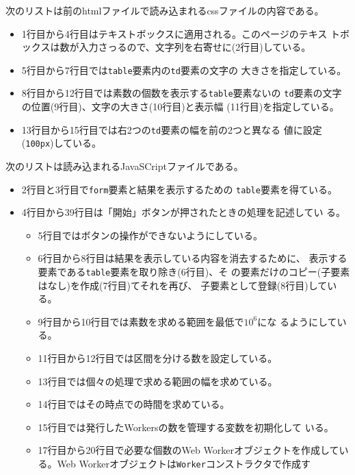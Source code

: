 \begin{Exec}
  次のリストは前のhtmlファイルで読み込まれるcssファイルの内容である。
 \begin{itemize}
  \item 1行目から4行目はテキストボックスに適用される。このページのテキス
        トボックスは数が入力さっるので、文字列を右寄せに(2行目)している。
  \item 5行目から7行目では\texttt{table}要素内の\texttt{td}要素の文字の
        大きさを指定している。 
  \item 8行目から12行目では素数の個数を表示する\texttt{table}要素ないの
        \texttt{td}要素の文字の位置(9行目)、文字の大きさ(10行目)と表示幅
        (11行目)を指定している。
  \item 13行目から15行目では右2つの\texttt{td}要素の幅を前の2つと異なる
        値に設定(\texttt{100px})している。
 \end{itemize}
 次のリストは読み込まれるJavaSCriptファイルである。
  \begin{itemize}
  \item 2行目と3行目で\texttt{form}要素と結果を表示するための
        \texttt{table}要素を得ている。
  \item 4行目から39行目は「開始」ボタンが押されたときの処理を記述してい
        る。
        \begin{itemize}
         \item 5行目ではボタンの操作ができないようにしている。
         \item 6行目から8行目は結果を表示している内容を消去するために、
               表示する要素である\texttt{table}要素を取り除き(6行目)、そ
               の要素だけのコピー(子要素はなし)を作成(7行目)てそれを再び、
               子要素として登録(8行目)している。
         \item 9行目から10行目では素数を求める範囲を最低で$10^{6}$にな
               るようにしている。
         \item 11行目から12行目では区間を分ける数を設定している。
         \item 13行目では個々の処理で求める範囲の幅を求めている。
         \item 14行目ではその時点での時間を求めている。
         \item 15行目では発行したWorkersの数を管理する変数を初期化して
               いる。
  \item 17行目から20行目で必要な個数のWeb Workerオブジェクトを作成してい
        る。Web Workerオブジェクトは\Verb+Worker+コンストラクタで作成す

\end{itemize}
\end{itemize}
\end{Exec}
